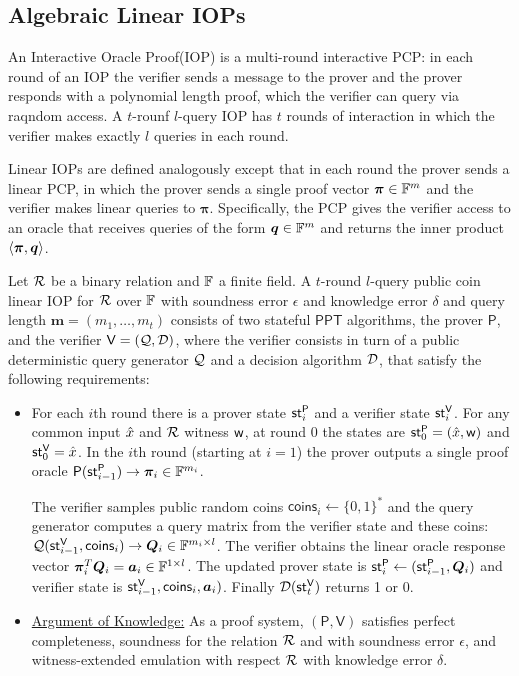 \documentclass[runningheads]{llncs}
\def\bitset{\{0,1\}}
\def\ppt{\mathsf{PPT}}
\def\prover{\mathsf{P}}
\def\verifier{\mathsf{V}}
\def\coins{\mathsf{coins}}
\begin{document}
\subsection{Algebraic Linear IOPs}
An Interactive Oracle Proof(IOP)\cite{BCS16, RRR16} is a multi-round interactive PCP: in each round of an IOP the verifier sends a message to the prover and the prover responds with a polynomial length proof, which the verifier can query via raqndom access.
A $t$-rounf $l$-query IOP has $t$ rounds of interaction in which the verifier makes exactly $l$ queries in each round.

Linear IOPs\cite{BBC+19} are defined analogously except that in each round the prover sends a linear PCP\cite{IKO07}, in which the prover sends a single proof vector $\bm{\pi} \in \mathbb{F}^m$ and the verifier makes linear queries to $\bm{\pi}$. Specifically, the PCP gives the verifier access to an oracle that receives queries of the form $\bm{q}\in\mathbb{F}^m$ and returns the inner product $\langle \bm{\pi},\bm{q}\rangle$.

\begin{definition}\label{defn:linearIOP}
	Let $\mathcal{R}$ be a binary relation and $\mathbb{F}$ a finite field. A $t$-round $l$-query public coin linear IOP for $\mathcal{R}$ over $\mathbb{F}$ with soundness error $\epsilon$ and knowledge error $\delta$ and query length $\bm{m}=(m_1,\ldots, m_t)$ consists of two stateful $\ppt$ algorithms, the prover $\prover$, and the verifier $\verifier = (\calQ, \calD)$, where the verifier consists in turn of a public deterministic query generator $\mathcal{Q}$ and a decision algorithm $\mathcal{D}$, that satisfy the following requirements:
	\begin{itemize}
		\item For each $i$th round there is a prover state $\st^{\prover}_i$ and a verifier state $\st^{\verifier}_i$. For any common input $\hat{x}$ and $\mathcal{R}$ witness $\mathsf{w}$, at round 0 the states are $\st^{\prover}_0 = (\stmt, \wit)$ and $\st^{\verifier}_0 = \stmt$. In the $i$th round (starting at $i=1$) the prover outputs a single proof oracle $\prover(\st^{\prover}_{i-1})\rightarrow \bm{\pi}_i \in \bbF^{m_i}$.
		
		The verifier samples public random coins $\coins_i \leftarrow \bitset^*$ and the query generator computes a query matrix from the verifier state and these coins: $\calQ(\st^{\verifier}_{i-1}, \coins_i)\rightarrow \bm{Q}_i \in \bbF^{m_i\times l}$. The verifier obtains the linear oracle response vector $\bm{\pi}_i^T\bm{Q}_i = \bm{a}_i \in \mathbb{F}^{1\times l}$. The updated prover state is $\st^{\prover}_i\leftarrow (\st^{\prover}_{i-1}, \bm{Q}_i)$ and verifier state is $\st^{\verifier}_{i-1}, \coins_i, \bm{a}_i)$. Finally $\calD(\st^{\verifier}_t)$ returns 1 or 0.
		
		\item \underline{Argument of Knowledge:} As a proof system, $(\prover, \verifier)$ satisfies perfect completeness, soundness for the relation $\mathcal{R}$ and with soundness error $\epsilon$, and witness-extended emulation with respect $\mathcal{R}$ with knowledge error $\delta$.
	\end{itemize}
\end{definition}
\end{document}
